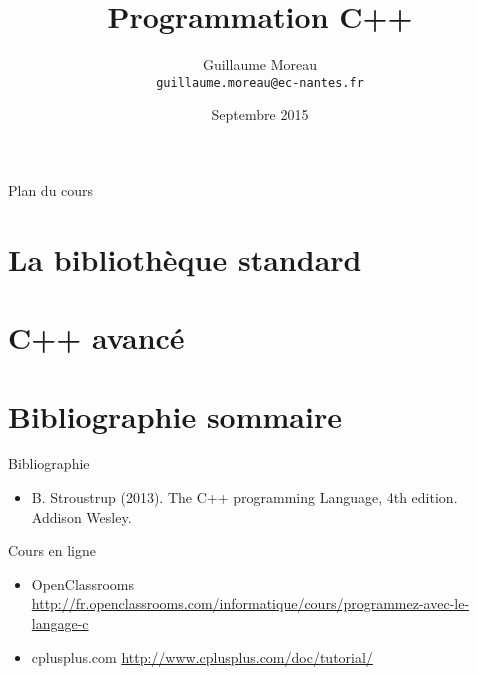 \documentclass[allowframebreaks,xcolor=dvipsnames]{beamer}
\title[Option RV / CPLUS] %
{Programmation C++}
\author[G. Moreau]{Guillaume Moreau\\
\texttt{guillaume.moreau@ec-nantes.fr}}
\institute[Ecole Centrale de Nantes] %
{
  Ecole Centrale de Nantes
}
\date %
{Septembre 2015}
\begin{document}
\begin{frame}
  \titlepage
\end{frame}

\begin{frame}[allowframebreaks]{Plan du cours}
  \tableofcontents[hideallsubsections]
\end{frame}



\section{La bibliothèque standard}



\section{C++ avancé}





\section{Bibliographie sommaire}

\begin{frame}{Bibliographie}
\begin{itemize}
\item B. Stroustrup (2013). The C++ programming Language, 4th edition. Addison Wesley.
\end{itemize}
\end{frame}

\begin{frame}{Cours en ligne}
\begin{itemize}
\item OpenClassrooms \url{http://fr.openclassrooms.com/informatique/cours/programmez-avec-le-langage-c}
\item cplusplus.com \url{http://www.cplusplus.com/doc/tutorial/}
\end{itemize}
\end{frame}
\end{document}
